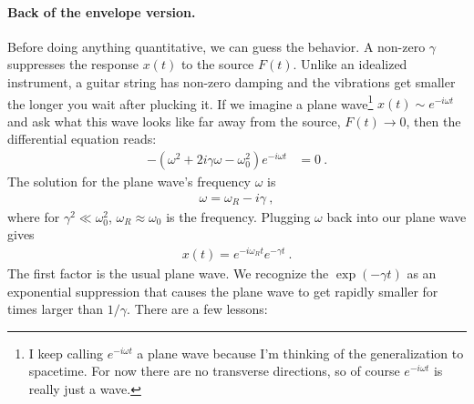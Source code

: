 \documentclass[
  11pt,
	colorful,
	raggedright,
]{tufte-style-thesis-flip}
\begin{document}
 \paragraph{Back of the envelope version.}
 Before doing anything quantitative, we can guess the behavior. A non-zero $\gamma$ suppresses the response $x(t)$ to the source $F(t)$. Unlike an idealized instrument, a guitar string has non-zero damping and the vibrations get smaller the longer you wait after plucking it. If we imagine a plane wave\footnote{I keep calling $e^{-i\omega t}$ a plane wave because I'm thinking of the generalization to spacetime. For now there are no transverse directions, so of course $e^{-i\omega t}$ is really just a wave.} $x(t)\sim e^{-i\omega t}$ and ask what this wave looks like far away from the source, $F(t)\to 0$, then the differential equation reads:
 \begin{align}
  -\left(\omega^2 +2i\gamma \omega - \omega_0^2\right)e^{-i\omega t} &= 0 \ .
 \end{align}
 The solution for the plane wave's frequency $\omega$ is
 \begin{align}
  \omega = \omega_R - i\gamma \ , \label{eq:DHO:back:envelope:poles}
 \end{align}
 where for $\gamma^2 \ll \omega_0^2$, $\omega_R \approx \omega_0$ is the frequency.  Plugging $\omega$ back into our plane wave gives
 \begin{align}
  x(t) = e^{-i\omega_R t}e^{-\gamma t} \ .
 \end{align}
 The first factor is the usual plane wave. We recognize the $\exp(-\gamma t)$ as an exponential suppression that causes the plane wave to get rapidly smaller for times larger than $1/\gamma$. There are a few lessons:
\end{document}
